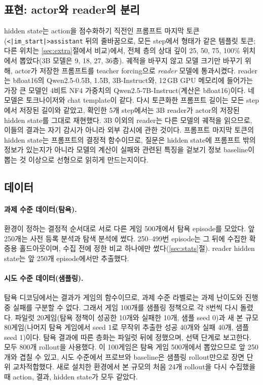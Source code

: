 \documentclass[11pt]{article}
\begin{document}
\subsection{표현: actor와 reader의 분리}
hidden state는 action을 점수화하기 직전인 프롬프트 마지막 토큰(\texttt{<|im\_start|>assistant} 뒤의 줄바꿈으로, 모든 step에서 형태가 같은 템플릿 토큰; 다른 위치는 \ref{sec:extra}절에서 비교)에서, 전체 층의 상대 깊이 25, 50, 75, 100\% 위치에서 뽑았다(3B 모델은 9, 18, 27, 36층).
궤적을 바꾸지 않고 모델 크기만 바꾸기 위해, actor가 저장한 프롬프트를 teacher forcing으로 \emph{reader} 모델에 통과시켰다.
reader는 bfloat16의 Qwen2.5-0.5B, 1.5B, 3B-Instruct와, 12\,GB GPU 메모리에 들어가는 가장 큰 모델인 4비트 NF4 가중치의 Qwen2.5-7B-Instruct(계산은 bfloat16)이다.
네 모델은 토크나이저와 chat template이 같다. 다시 토큰화한 프롬프트 길이는 모든 step에서 저장된 길이와 같았고,
확인한 5개 step에서는 3B reader가 actor의 저장된 hidden state를 그대로 재현했다.
3B 이외의 reader는 다른 모델의 궤적을 읽으므로, 이들의 결과는 자기 감시가 아니라 외부 감시에 관한 것이다. 프롬프트 마지막 토큰의 hidden state는 프롬프트의 결정적 함수이므로, 질문은 hidden state에 프롬프트 밖의 정보가 있는지가 아니라 모델의 계산이 실패와 관련된 특징을 겉보기 정보 baseline이 뽑는 것 이상으로 선형으로 읽히게 만드는지이다.

\subsection{데이터}
\paragraph{과제 수준 데이터(탐욕).} 환경이 정하는 결정적 순서대로 서로 다른 게임 500개에서 탐욕 episode를 모았다.
앞 250개는 사전 등록 분석과 탐색 분석에 썼다. 250--499번 episode는 그 뒤에 수집한 확증용 홀드아웃이며,
수집 전에 정한 비교 하나에만 썼다(\ref{sec:stats}절). reader hidden state는 앞 250개 episode에서만 추출했다.

\paragraph{시도 수준 데이터(샘플링).} 탐욕 디코딩에서는 결과가 게임의 함수이므로, 과제 수준 라벨로는 과제 난이도와 진행 중 실패를 구분할 수 없다.
그래서 게임 100개를 샘플링 정책으로 각 8번씩 다시 돌렸다. 파일럿 20게임(탐욕 정책이 성공한 10개와 실패한 10개, 샘플 seed 0)과
새 본 규모 80게임(나머지 탐욕 게임에서 seed 1로 무작위 추출한 성공 40개와 실패 40개, 샘플 seed 1)이다.
탐욕 결과에 따른 층화는 파일럿 뒤에 정했으며, 선택 단계로 보고한다. 모두 800개 rollout을 사용했다. 이 100게임은 탐욕 게임 500개에서 뽑았으므로 앞 250개와 겹칠 수 있고, 시도 수준에서 프로브와 baseline은 샘플링 rollout만으로 장면 단위 교차적합했다.
새로 설치한 환경에서 본 규모의 처음 24개 rollout을 다시 수집했을 때 action, 결과, hidden state가 모두 같았다.
\end{document}
